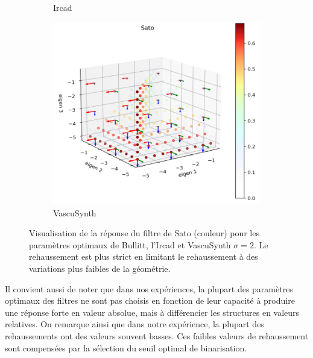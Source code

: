 \begin{figure}[!ht]
\begin{subfigure}[t]{0.45\textwidth}
    \caption{Ircad}
  \end{subfigure}
  
  \begin{subfigure}[t]{0.45\textwidth}
    \includegraphics[width=\textwidth]{Images/Ircad_Sato_BP.png}
    \caption{VascuSynth}
  \end{subfigure}
  \caption{Visualisation de la réponse du filtre de Sato (couleur) pour les paramètres optimaux de Bullitt, l'Ircad et VascuSynth $\sigma=2$. Le rehaussement est plus strict en limitant le rehaussement à des variations plus faibles de la géométrie.}
  \label{fig:exemple_geometry_Sato}
\end{figure}
Il convient aussi de noter que dans nos expériences, la plupart des paramètres optimaux des filtres ne sont pas choisis en fonction de leur capacité à produire une réponse forte en valeur absolue, mais à différencier les structures en valeurs relatives. On remarque ainsi que dans notre expérience, la plupart des rehaussements ont des valeurs souvent basses. Ces faibles valeurs de rehaussement sont compensées par la sélection du seuil optimal de binarisation. 

